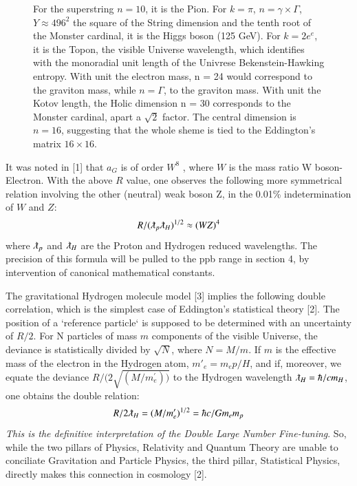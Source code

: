 \documentclass[twoside,draft]{article}
\begin{document}
\begin{sloppypar}
{\begin{figure}
{    For the superstring $n = 10$, it is the Pion. For $k = \pi$, $n = \gamma \times \Gamma$, $Y \approx 496^2$ 
    the square of the String dimension and the tenth root of the Monster cardinal, it is
    the Higgs boson (125 GeV). For $k = 2e^e$, it is the Topon, the visible Universe wavelength,
    which identifies with the monoradial unit length of the Univrese Bekenstein-Hawking entropy.
    With unit the electron mass, n = 24 would correspond to the graviton mass, while $n = \Gamma$, 
    to the graviton mass.
    With unit the Kotov length, the Holic dimension n = 30 corresponds to the Monster cardinal, 
    apart a $\sqrt2$ factor.}
    The central dimension is $n = 16$, suggesting that the whole sheme is tied to the Eddington's matrix $16 \times 16$.
\label{fig:figure_label}
\end{figure}

It was noted in [1] that $a_{G}$ is of order $W^{8}$ , where $W$ is the mass ratio W boson-
Electron. With the above $R$ value, one observes the following more symmetrical relation involving
the other (neutral) weak boson Z, in the 0.01\% indetermination of $W$ and $Z$:
\begin{equation}
R/(\lambdabar_{p}\lambdabar_{H})^{1/2}\approx (WZ)^4
\end{equation}
where $\lambdabar_{p}$ and $\lambdabar_{H}$ are the Proton and Hydrogen reduced wavelengths. The precision of this formula will be pulled to the ppb range in section 4, by intervention of canonical mathematical constants.

The gravitational Hydrogen molecule model [3] implies the following double correlation,
which is the simplest case of Eddington's statistical theory [2]. The position of a `reference particle`
is supposed to be determined with an uncertainty of ${R/2}$. For N particles of mass $m$ components of the visible Universe, the deviance is statistically divided by $\sqrt{N}$, where $N = M/m$. If $m$ is the effective mass of the electron in the Hydrogen atom, $m\prime_{e} = m_{e} p/H$, and if, moreover, we equate
the deviance $R/(2\sqrt{(M/m^{\prime}_{e}))}$ to the Hydrogen wavelength $\lambdabar_{H} = \hbar/c m_{H}$, one obtains the double relation:
\begin{equation}
R/2\lambdabar_{H} = (M/m^{\prime}_{e})^{1/2} = \hbar c/G m_{e} m_{p}
\end{equation}
\textit{This is the definitive interpretation of the Double Large Number Fine-tuning}. So, while the two
pillars of Physics, Relativity and Quantum Theory are unable to conciliate Gravitation and Particle
Physics, the third pillar, Statistical Physics, directly makes this connection in cosmology [2].

}
\end{sloppypar}
\end{document}
